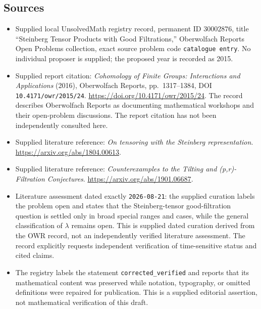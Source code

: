 \documentclass[11pt]{article}
\begin{document}
\subsection{Sources}
\begin{itemize}
\item Supplied local UnsolvedMath registry record, permanent ID \(30002876\), title ``Steinberg Tensor Products with Good Filtrations,'' Oberwolfach Reports Open Problems collection, exact source problem code \texttt{catalogue entry}. No individual proposer is supplied; the proposed year is recorded as 2015.
\item Supplied report citation: \emph{Cohomology of Finite Groups: Interactions and Applications} (2016), Oberwolfach Reports, pp.\ 1317--1384, DOI \texttt{10.4171/owr/2015/24}. \url{https://doi.org/10.4171/owr/2015/24}. The record describes Oberwolfach Reports as documenting mathematical workshops and their open-problem discussions. The report citation has not been independently consulted here.
\item Supplied literature reference: \emph{On tensoring with the Steinberg representation}. \url{https://arxiv.org/abs/1804.00613}.
\item Supplied literature reference: \emph{Counterexamples to the Tilting and (p,r)-Filtration Conjectures}. \url{https://arxiv.org/abs/1901.06687}.
\item Literature assessment dated exactly \texttt{2026-08-21}: the supplied curation labels the problem open and states that the Steinberg-tensor good-filtration question is settled only in broad special ranges and cases, while the general classification of \(\lambda\) remains open. This is supplied dated curation derived from the OWR record, not an independently verified literature assessment. The record explicitly requests independent verification of time-sensitive status and cited claims.
\item The registry labels the statement \texttt{corrected\_verified} and reports that its mathematical content was preserved while notation, typography, or omitted definitions were repaired for publication. This is a supplied editorial assertion, not mathematical verification of this draft.
\end{itemize}
\end{document}
